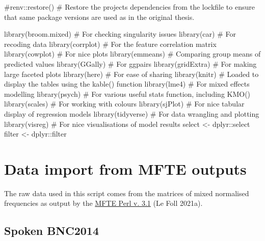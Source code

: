 \documentclass[
  letterpaper,
  DIV=11,
  numbers=noendperiod]{scrreprt}
\newenvironment{Shaded}{\begin{snugshade}}{\end{snugshade}}
\newcommand{\CommentTok}[1]{\textcolor[rgb]{0.37,0.37,0.37}{#1}}
\newcommand{\FunctionTok}[1]{\textcolor[rgb]{0.28,0.35,0.67}{#1}}
\newcommand{\NormalTok}[1]{\textcolor[rgb]{0.00,0.23,0.31}{#1}}
\newcommand{\OtherTok}[1]{\textcolor[rgb]{0.00,0.23,0.31}{#1}}
\newcommand{\SpecialCharTok}[1]{\textcolor[rgb]{0.37,0.37,0.37}{#1}}
\begin{document}
\begin{Shaded}
\begin{Highlighting}[]
\CommentTok{\#renv::restore() \# Restore the project\textquotesingle{}s dependencies from the lockfile to ensure that same package versions are used as in the original thesis.}

\FunctionTok{library}\NormalTok{(broom.mixed) }\CommentTok{\# For checking singularity issues }
\FunctionTok{library}\NormalTok{(car) }\CommentTok{\# For recoding data}
\FunctionTok{library}\NormalTok{(corrplot) }\CommentTok{\# For the feature correlation matrix}
\FunctionTok{library}\NormalTok{(cowplot) }\CommentTok{\# For nice plots}
\FunctionTok{library}\NormalTok{(emmeans) }\CommentTok{\# Comparing group means of predicted values}
\FunctionTok{library}\NormalTok{(GGally) }\CommentTok{\# For ggpairs}
\FunctionTok{library}\NormalTok{(gridExtra) }\CommentTok{\# For making large faceted plots}
\FunctionTok{library}\NormalTok{(here) }\CommentTok{\# For ease of sharing}
\FunctionTok{library}\NormalTok{(knitr) }\CommentTok{\# Loaded to display the tables using the kable() function}
\FunctionTok{library}\NormalTok{(lme4) }\CommentTok{\# For mixed effects modelling}
\FunctionTok{library}\NormalTok{(psych) }\CommentTok{\# For various useful stats function, including KMO()}
\FunctionTok{library}\NormalTok{(scales) }\CommentTok{\# For working with colours}
\FunctionTok{library}\NormalTok{(sjPlot) }\CommentTok{\# For nice tabular display of regression models}
\FunctionTok{library}\NormalTok{(tidyverse) }\CommentTok{\# For data wrangling and plotting}
\FunctionTok{library}\NormalTok{(visreg) }\CommentTok{\# For nice visualisations of model results}
\NormalTok{select }\OtherTok{\textless{}{-}}\NormalTok{ dplyr}\SpecialCharTok{::}\NormalTok{select}
\NormalTok{filter }\OtherTok{\textless{}{-}}\NormalTok{ dplyr}\SpecialCharTok{::}\NormalTok{filter}
\end{Highlighting}
\end{Shaded}

\section{Data import from MFTE
outputs}\label{data-import-from-mfte-outputs}

The raw data used in this script comes from the matrices of mixed
normalised frequencies as output by the
\href{https://github.com/mshakirDr/MultiFeatureTaggerEnglish}{MFTE Perl
v. 3.1} (Le Foll 2021a).

\subsection{Spoken BNC2014}\label{spoken-bnc2014-1}
\end{document}
